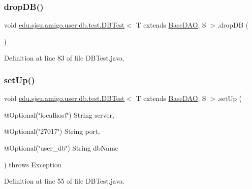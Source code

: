 \subsubsection{\texorpdfstring{drop\+D\+B()}{dropDB()}}
{\footnotesize\ttfamily void \hyperlink{classedu_1_1sjsu_1_1amigo_1_1user_1_1db_1_1test_1_1_d_b_test}{edu.\+sjsu.\+amigo.\+user.\+db.\+test.\+D\+B\+Test}$<$ T extends \hyperlink{interfaceedu_1_1sjsu_1_1amigo_1_1db_1_1common_1_1_base_d_a_o}{Base\+D\+AO}, S $>$.drop\+DB (\begin{DoxyParamCaption}{ }\end{DoxyParamCaption})}



Definition at line 83 of file D\+B\+Test.\+java.

\mbox{\label{classedu_1_1sjsu_1_1amigo_1_1user_1_1db_1_1test_1_1_d_b_test_ad45f09de863c6824c0bebdb308b94bf7}} 
\subsubsection{\texorpdfstring{set\+Up()}{setUp()}}
{\footnotesize\ttfamily void \hyperlink{classedu_1_1sjsu_1_1amigo_1_1user_1_1db_1_1test_1_1_d_b_test}{edu.\+sjsu.\+amigo.\+user.\+db.\+test.\+D\+B\+Test}$<$ T extends \hyperlink{interfaceedu_1_1sjsu_1_1amigo_1_1db_1_1common_1_1_base_d_a_o}{Base\+D\+AO}, S $>$.set\+Up (\begin{DoxyParamCaption}\item[{@Optional(\char`\"{}localhost\char`\"{}) String}]{server,  }\item[{@Optional(\char`\"{}27017\char`\"{}) String}]{port,  }\item[{@Optional(\char`\"{}user\+\_\+db\char`\"{}) String}]{db\+Name }\end{DoxyParamCaption}) throws Exception}



Definition at line 55 of file D\+B\+Test.\+java.

\mbox{\label{classedu_1_1sjsu_1_1amigo_1_1user_1_1db_1_1test_1_1_d_b_test_adfbadef8f2b0158b57e6fed4985ee19c}} 
